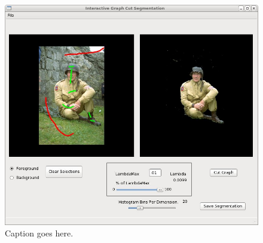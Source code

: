 \documentclass[10pt]{article}
\begin{document}
\begin{center}
  \begin{figure}[H]
    \centering
    \includegraphics[width=0.4\linewidth]{Soldier}
    \caption{Caption goes here.}
    \label{fig:HighLambda}
  \end{figure}
\end{center} 
\end{document}
